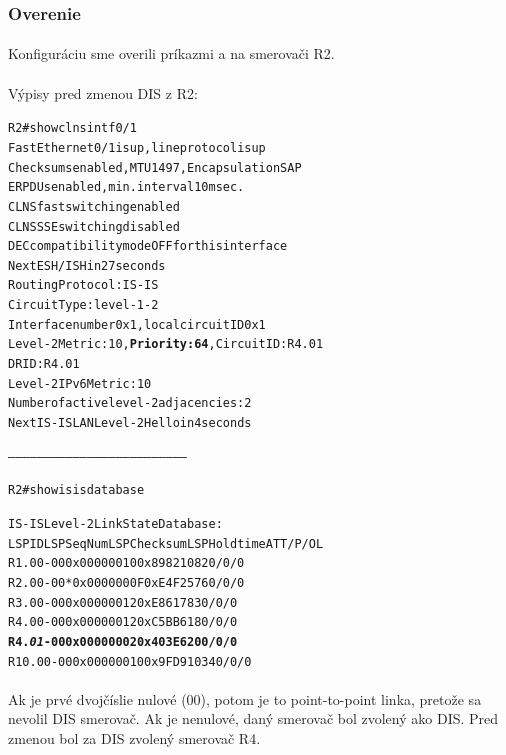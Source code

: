 \documentclass[12pt,twoside,a4paper]{report}
\begin{document}
\subsubsection{Overenie}
\paragraph{}
Konfiguráciu sme overili príkazmi  a  na smerovači R2.

\paragraph{}
Výpisy pred zmenou DIS z R2:

\noindent
{\selectfont
\begin{small}
\begin{alltt}
R2#show clns int f0/1
FastEthernet0/1 is up, line protocol is up
  Checksums enabled, MTU 1497, Encapsulation SAP
  ERPDUs enabled, min. interval 10 msec.
  CLNS fast switching enabled
  CLNS SSE switching disabled
  DEC compatibility mode OFF for this interface
  Next ESH/ISH in 27 seconds
  Routing Protocol: IS-IS
    Circuit Type: level-1-2
    Interface number 0x1, local circuit ID 0x1
    Level-2 Metric: 10, \textbf{Priority: 64}, Circuit ID: R4.01
    DR ID: R4.01
    Level-2 IPv6 Metric: 10
    Number of active level-2 adjacencies: 2
    Next IS-IS LAN Level-2 Hello in 4 seconds


--------------------------------------------------------------------------


R2#show isis database

IS-IS Level-2 Link State Database:
LSPID                 LSP Seq Num  LSP Checksum  LSP Holdtime      ATT/P/OL
R1.00-00              0x00000010   0x8982        1082              0/0/0
R2.00-00            * 0x0000000F   0xE4F2        576               0/0/0
R3.00-00              0x00000012   0xE861        783               0/0/0
R4.00-00              0x00000012   0xC5BB        618               0/0/0
\textbf{R4.\textit{01}-00              0x00000002   0x403E        620               0/0/0}
R10.00-00             0x00000010   0x9FD9        1034              0/0/0

\end{alltt}
\end{small}
}

\paragraph{}
Ak je prvé dvojčíslie nulové (00), potom je to point-to-point linka, pretože sa nevolil DIS smerovač. Ak je nenulové, daný smerovač bol zvolený ako DIS. Pred zmenou bol za DIS zvolený smerovač R4.
\end{document}
